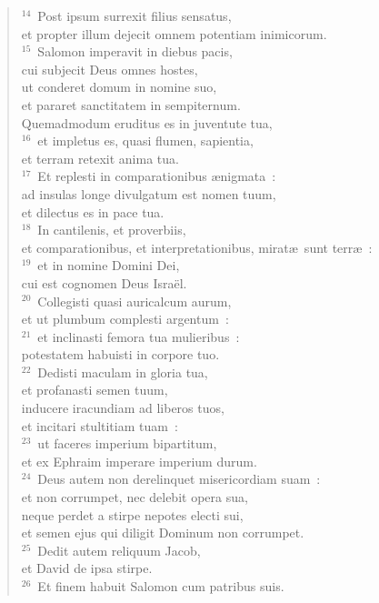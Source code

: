 \begin{flushleft}\begin{verse}${}^{14}$~Post ipsum surrexit filius sensatus,\\ et propter illum dejecit omnem potentiam inimicorum.\\
${}^{15}$~Salomon imperavit in diebus pacis,\\ cui subjecit Deus omnes hostes,\\ ut conderet domum in nomine suo,\\ et pararet sanctitatem in sempiternum.\\ Quemadmodum eruditus es in juventute tua,\\
${}^{16}$~et impletus es, quasi flumen, sapientia,\\ et terram retexit anima tua.\\
${}^{17}$~Et replesti in comparationibus \ae nigmata~:\\ ad insulas longe divulgatum est nomen tuum,\\ et dilectus es in pace tua.\\
${}^{18}$~In cantilenis, et proverbiis,\\ et comparationibus, et interpretationibus, mirat\ae\ sunt terr\ae~:\\
${}^{19}$~et in nomine Domini Dei,\\ cui est cognomen Deus Isra\"el.\\
${}^{20}$~Collegisti quasi auricalcum aurum,\\ et ut plumbum complesti argentum~:\\
${}^{21}$~et inclinasti femora tua mulieribus~:\\ potestatem habuisti in corpore tuo.\\
${}^{22}$~Dedisti maculam in gloria tua,\\ et profanasti semen tuum,\\ inducere iracundiam ad liberos tuos,\\ et incitari stultitiam tuam~:\\
${}^{23}$~ut faceres imperium bipartitum,\\ et ex Ephraim imperare imperium durum.\\
${}^{24}$~Deus autem non derelinquet misericordiam suam~:\\ et non corrumpet, nec delebit opera sua,\\ neque perdet a stirpe nepotes electi sui,\\ et semen ejus qui diligit Dominum non corrumpet.\\
${}^{25}$~Dedit autem reliquum Jacob,\\ et David de ipsa stirpe.\\
${}^{26}$~Et finem habuit Salomon cum patribus suis.\end{verse}\end{flushleft}


